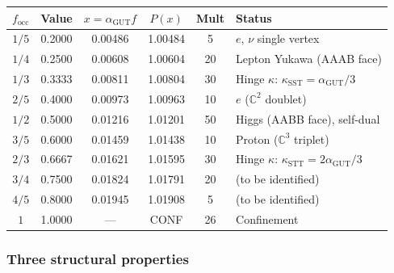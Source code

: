 \documentclass[12pt]{article}
\theoremstyle{remark}
\theoremstyle{definition}
\newcommand{\CC}{\mathbb{C}}
\newcommand{\agut}{\alpha_{\mathrm{GUT}}}
\begin{document}
\begin{center}
\begin{tabular}{cccccl}
\hline
$f_\mathrm{occ}$ & Value & $x = \agut f$ & $P(x)$ & Mult & Status \\
\hline
$1/5$ & 0.2000 & 0.00486 & 1.00484 & 5 & $e$, $\nu$ single vertex \\
$1/4$ & 0.2500 & 0.00608 & 1.00604 & 20 & Lepton Yukawa (AAAB face) \\
$1/3$ & 0.3333 & 0.00811 & 1.00804 & 30 & Hinge $\kappa$: $\kappa_\mathrm{SST} = \agut/3$ \\
$2/5$ & 0.4000 & 0.00973 & 1.00963 & 10 & $e$ ($\CC^2$ doublet) \\
$1/2$ & 0.5000 & 0.01216 & 1.01201 & 50 & Higgs (AABB face), self-dual \\
$3/5$ & 0.6000 & 0.01459 & 1.01438 & 10 & Proton ($\CC^3$ triplet) \\
$2/3$ & 0.6667 & 0.01621 & 1.01595 & 30 & Hinge $\kappa$: $\kappa_\mathrm{STT} = 2\agut/3$ \\
$3/4$ & 0.7500 & 0.01824 & 1.01791 & 20 & (to be identified) \\
$4/5$ & 0.8000 & 0.01945 & 1.01908 & 5 & (to be identified) \\
$1$   & 1.0000 & ---     & CONF    & 26 & Confinement \\
\hline
\end{tabular}
\end{center}

\subsubsection{Three structural properties}
\end{document}

